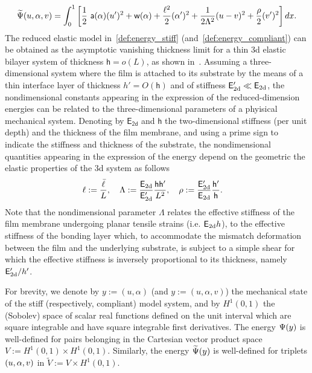 \documentclass[10pt]{article}
\begin{document}
\begin{equation}
    \label{def:energy_compliant}
    \widetilde\Psi( u, \alpha,  v) = \int_{0}^1 \left[ \frac{1}{2} \ \mathsf{a}(\alpha)(u')^2 + \mathsf{w}(\alpha) + \frac{\ell^2}{2}(\alpha')^2
        + \frac{1}{2 \Lambda^2} (u- v)^2
        + \frac{\rho}{2}  (v')^2 \right] dx.
\end{equation}
{The reduced elastic model in~\eqref{def:energy_stiff} (and~\eqref{def:energy_compliant}) can be obtained as the asymptotic vanishing thickness limit for a thin 3d elastic bilayer system of thickness  $\mathsf h = o(L)$, as shown in~\cite{Leon_Baldelli2015-rp}. Assuming a three-dimensional system where the film is attached to its substrate by the means of a thin interface layer of thickness $h'=O(\mathsf h)$ and of stiffness ${\mathsf{E_{\text{2d}}'}} \ll \mathsf{E_{\text{2d}}}$, the nondimensional constants appearing in the expression of the reduced-dimension energies can be related to the three-dimensional parameters of a phyisical mechanical system.}
Denoting by $\mathsf{E_\text{2d}}$ and $\mathsf h$ the two-dimensional stiffness (per unit depth) and the thickness of the film membrane, and using a prime sign to indicate the stiffness and thickness of the substrate, the nondimensional quantities appearing in the expression of the energy depend on the geometric the elastic properties of the 3d system as follows
\begin{equation}
    \label{def:dimensional_parameters}
    \ell := \frac{\bar{\ell}}{L}, \quad
    \Lambda := \frac{\mathsf{E_{\text{2d}}}}{{\mathsf{E_{\text{2d}}'}}}{\frac{\mathsf h \mathsf h'}{L^2}}, \quad
    \rho := \frac{{\mathsf{E_{\text{2d}}'}}}{\mathsf{E_{\text{2d}}}}{\frac{\mathsf{h'}}{\mathsf h}}. \quad
\end{equation}
Note that the nondimensional parameter $\Lambda$ relates the effective stiffness of the film membrane undergoing planar tensile strains (i.e. $\mathsf{E_{\text{2d}}} h$), to the effective stiffness of the bonding layer which, to accommodate the mismatch deformation between the film and the underlying substrate, is subject to a simple shear for which the effective stiffness is inversely proportional to its thickness, namely ${\mathsf{E_{\text{2d}}'}} / h'$.

For brevity, we denote by $y:=(u, \alpha)$ (and $y:=(u, \alpha, v)$) the mechanical state of the stiff (respectively, compliant) model system, and by $H^1(0, 1)$ the (Sobolev) space of scalar real functions defined on the unit interval which are square integrable and have square integrable first derivatives. The energy $\Psi(y)$ is well-defined for pairs belonging in the Cartesian vector product space $V:=H^1(0,1)\times  H^1(0,1)$. Similarly, the energy $\widetilde\Psi(y)$ is well-defined for triplets $(u, \alpha, v)$ in $\widetilde V:=V\times  H^1(0,1)$.
\end{document}
